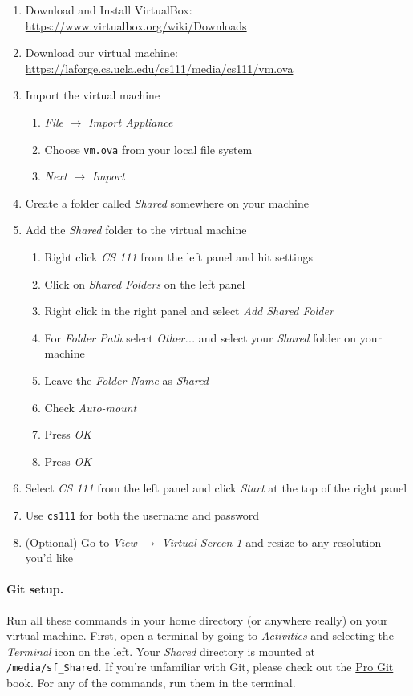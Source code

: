 \begin{enumerate}
  \item Download and Install VirtualBox:
        \url{https://www.virtualbox.org/wiki/Downloads}
  \item Download our virtual machine:
        \url{https://laforge.cs.ucla.edu/cs111/media/cs111/vm.ova}
  \item Import the virtual machine
    \begin{enumerate}
      \item \textit{File} $\rightarrow$ \textit{Import Appliance}
      \item Choose \lstinline|vm.ova| from your local file system
      \item \textit{Next} $\rightarrow$ \textit{Import}
    \end{enumerate}
  \item Create a folder called \textit{Shared} somewhere on your machine
  \item Add the \textit{Shared} folder to the virtual machine
    \begin{enumerate}
      \item Right click \textit{CS 111} from the left panel and hit settings
      \item Click on \textit{Shared Folders} on the left panel
      \item Right click in the right panel and select \textit{Add Shared Folder}
      \item For \textit{Folder Path} select \textit{Other...} and select your
            \textit{Shared} folder on your machine
      \item Leave the \textit{Folder Name} as \textit{Shared}
      \item Check \textit{Auto-mount}
      \item Press \textit{OK}
      \item Press \textit{OK}
    \end{enumerate}
  \item Select \textit{CS 111} from the left panel and click \textit{Start} at
        the top of the right panel
  \item Use \lstinline|cs111| for both the username and password
  \item (Optional) Go to \textit{View} $\rightarrow$ \textit{Virtual Screen 1}
        and resize to any resolution you'd like
\end{enumerate}

\paragraph{Git setup.}
Run all these commands in your home directory (or anywhere really) on your
virtual machine.
First, open a terminal by going to \textit{Activities} and selecting the
\textit{Terminal} icon on the left.
Your \textit{Shared} directory is mounted at \lstinline|/media/sf_Shared|.
If you're unfamiliar with Git, please check out the
\href{https://git-scm.com/book/en/v2/}{Pro Git} book.
For any of the commands, run them in the terminal.

